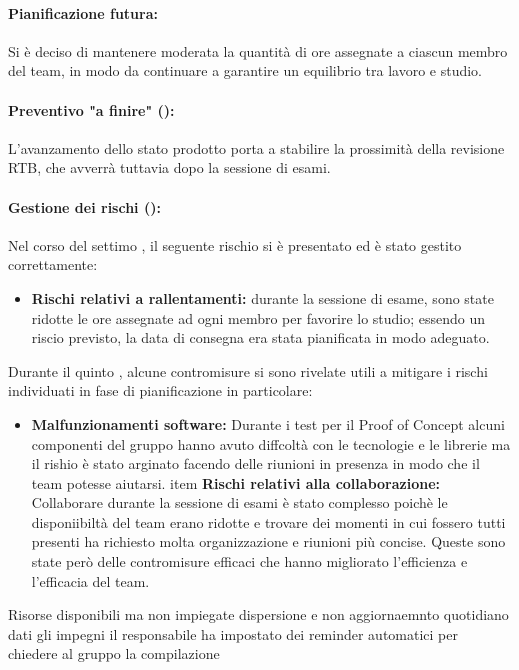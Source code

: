 \paragraph*{Pianificazione futura:}
\par Si è deciso di mantenere moderata la quantità di ore assegnate a ciascun membro del team, in modo da continuare a garantire un equilibrio tra lavoro e studio.

\paragraph*{Preventivo "a finire" ():}
\par L'avanzamento dello stato prodotto porta a stabilire la prossimità della revisione RTB, che avverrà tuttavia dopo la sessione di esami.

\paragraph*{Gestione dei rischi ():}
\par Nel corso del settimo , il seguente rischio si è presentato ed è stato gestito correttamente:
\begin{itemize}
  \item \textbf{Rischi relativi a rallentamenti:} durante la sessione di esame, sono state ridotte le ore assegnate ad ogni membro per favorire lo studio; essendo un riscio previsto, la data di consegna era stata pianificata in modo adeguato.
\end{itemize}

\vspace{0.5\baselineskip}
\par Durante il quinto , alcune contromisure si sono rivelate utili a mitigare i rischi individuati in fase di pianificazione in particolare:
\begin{itemize}
  \item \textbf{Malfunzionamenti software:} Durante i test per il Proof of Concept alcuni componenti del gruppo hanno avuto diffcoltà con le tecnologie e le librerie ma il rishio è stato arginato facendo delle riunioni in presenza in modo che il team potesse aiutarsi.
  item \textbf{Rischi relativi alla collaborazione:} Collaborare durante la sessione di esami è stato complesso poichè le disponiibiltà del team erano ridotte e trovare dei momenti in cui fossero tutti presenti ha richiesto molta organizzazione e riunioni più concise. Queste sono state però delle contromisure efficaci che hanno migliorato l'efficienza e l'efficacia del team. 
\end{itemize}
Risorse disponibili ma non impiegate dispersione e non aggiornaemnto quotidiano dati gli impegni il responsabile ha impostato dei reminder automatici per chiedere al gruppo la compilazione